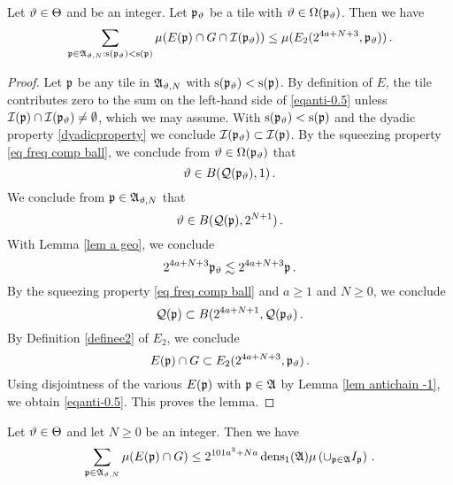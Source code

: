 \begin{lemma}\label{lem antichain-.5}
Let $\vartheta\in\Theta$ and  be
an integer. Let $\mathfrak p_\vartheta$ be a tile with $\vartheta\in \Omega(\mathfrak p_\vartheta)$.
Then we have
\begin{equation}\label{eqanti-0.5}
    \sum_{\mathfrak p\in\mathfrak{A}_{\vartheta,N}: \mathrm{s}(\mathfrak p_\vartheta)<\mathrm{s}(\mathfrak p)}\mu(E(\mathfrak p)\cap G \cap \mathcal{I}(\mathfrak p_\vartheta))
    \le  \mu (E_2(2^{4a+N+3},\mathfrak p_\vartheta))
 \, .
\end{equation}



\end{lemma}

\begin{proof}


Let $\mathfrak p$ be any tile in $\mathfrak{A}_{\vartheta,N}$ with $\mathrm{s}(\mathfrak p_\vartheta)<\mathrm{s}(\mathfrak p)$. By definition of
$E$, the tile contributes zero to the sum on the left-hand side of \eqref{eqanti-0.5} unless
 $\mathcal{I}(\mathfrak p)\cap \mathcal{I}(\mathfrak p_{\vartheta}) \neq \emptyset$, which we may assume. With $\mathrm{s}(\mathfrak p_\vartheta)<\mathrm{s}(\mathfrak p)$
and the dyadic property
\eqref{dyadicproperty} we conclude $\mathcal{I}(\mathfrak p_{\vartheta})\subset  \mathcal{I}(\mathfrak p)$.
By the squeezing property
\eqref{eq freq comp ball},
we conclude from
$\vartheta\in \Omega(\mathfrak p_\vartheta)$
that
\begin{equation}
    \vartheta\in B(\mathcal{Q}(\mathfrak p_\vartheta), 1)\, .
\end{equation}
We conclude from $\mathfrak p \in \mathfrak{A}_{\vartheta,N}$ that
\begin{equation}
    \vartheta \in B(\mathcal{Q}(\mathfrak p), 2^{N+1})\, .
\end{equation}
With Lemma \ref{lem a geo}, we conclude
 \begin{equation}
     2^{4a+N+3}\mathfrak p_\vartheta  \lesssim  2^{4a+N+3}\mathfrak p \, .
 \end{equation}
By the squeezing property \eqref{eq freq comp ball}
and $a\ge 1$ and $N\ge 0$, we conclude
\begin{equation}
    \mathcal{Q}(\mathfrak p)\subset B(2^{4a+N+1}, \mathcal{Q}(\mathfrak p_\vartheta)\, .
\end{equation}
By Definition \eqref{definee2} of $E_2$,
  we conclude
\begin{equation}
E(\mathfrak p)\cap G \subset E_2(2^{4a+N+3},\mathfrak p_\vartheta)\, .
\end{equation}
Using disjointness of the various $E(\mathfrak p)$ with $\mathfrak p\in \mathfrak{A}$  by Lemma \ref{lem antichain -1}, we obtain \eqref{eqanti-0.5}.
This proves the lemma.
\end{proof}
\begin{lemma}
\label{lem antichain 0}
Let $\vartheta\in\Theta$ and let $N\ge 0$  be
an integer. Then we have
\begin{equation}\label{eqanti00}
    \sum_{\mathfrak p\in\mathfrak{A}_{\vartheta,N}}\mu(E(\mathfrak p)\cap G)
    \le
 2^{101a^3+Na}\operatorname{\operatorname{dens}}_1(\mathfrak{A})\mu\left(\cup_{\mathfrak p\in\mathfrak{A}}I_{\mathfrak p}\right)\, .
\end{equation}
\end{lemma}



